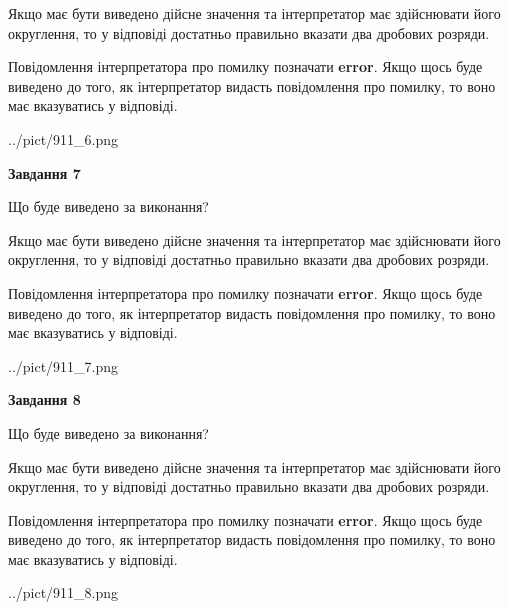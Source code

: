 \documentclass[12pt, ukrainian]{article}
\begin{document}
{\begin {Large}
Якщо має бути виведено дійсне значення та інтерпретатор має здійснювати його округлення, 
то у відповіді достатньо правильно вказати два дробових розряди.

Повідомлення інтерпретатора про помилку позначати \textbf{error}.
Якщо щось буде виведено до того, як інтерпретатор видасть повідомлення про помилку, 
то воно має вказуватись у відповіді. \par

\begin{center}
	{../pict/911_6.png}
\end{center}
\newpage

{\begin {center}\textbf{Завдання 7}\end {center}}\par
Що буде виведено за виконання? \par

Якщо має бути виведено дійсне значення та інтерпретатор має здійснювати його округлення, 
то у відповіді достатньо правильно вказати два дробових розряди.

Повідомлення інтерпретатора про помилку позначати \textbf{error}.
Якщо щось буде виведено до того, як інтерпретатор видасть повідомлення про помилку, 
то воно має вказуватись у відповіді. \par

\begin{center}
	{../pict/911_7.png}
\end{center}
\newpage

{\begin {center}\textbf{Завдання 8}\end {center}}\par
Що буде виведено за виконання? \par

Якщо має бути виведено дійсне значення та інтерпретатор має здійснювати його округлення, 
то у відповіді достатньо правильно вказати два дробових розряди.

Повідомлення інтерпретатора про помилку позначати \textbf{error}.
Якщо щось буде виведено до того, як інтерпретатор видасть повідомлення про помилку, 
то воно має вказуватись у відповіді. \par

\begin{center}
	{../pict/911_8.png}
\end{center}
\newpage


\end{Large}}
\end{document}
